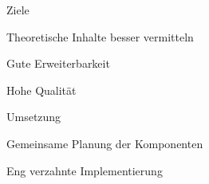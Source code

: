 



{
    \begin{itemgroup}{}
    \item Ziele
      \begin{itemgroup}{}
      \item Theoretische Inhalte besser vermitteln
      \item Gute Erweiterbarkeit
      \item Hohe Qualität
      \end{itemgroup}
	\item Umsetzung
	  \begin{itemgroup}{}
      \item Gemeinsame Planung der Komponenten
      \item Eng verzahnte Implementierung
      \end{itemgroup}
    \end{itemgroup}
    
    \vfill{}
}


